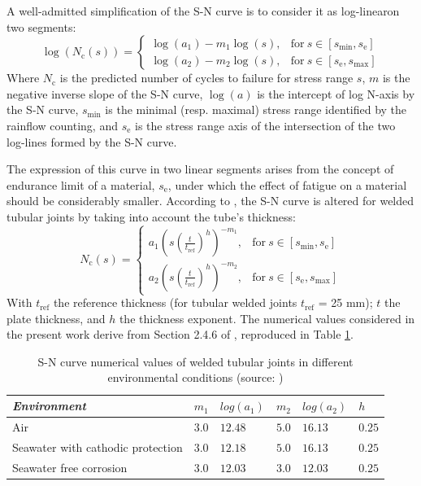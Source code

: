 A well-admitted simplification of the S-N curve is to consider it as log-linear\footnotemark on two segments:
\begin{equation}
\log(N_{\mathrm{c}}(s)) = \left\{
    \begin{array}{ll}
        \log(a_1) - m_1 \log(s), & \mbox{for}~ s \in [s_{\mathrm{min}}, s_{\mathrm{e}}] \\
        \log(a_2) - m_2 \log(s), & \mbox{for}~ s \in [s_{\mathrm{e}}, s_{\mathrm{max}}]
    \end{array}
\right.
\end{equation}
Where $N_{\mathrm{c}}$ is the predicted number of cycles to failure for stress range $s$, $m$ is the negative inverse slope of the S-N curve, 
$\log(a)$ is the intercept of log N-axis by the S-N curve, $s_{\mathrm{min}}$ is the minimal (resp. maximal) stress range identified by the rainflow counting, 
and $s_{\mathrm{e}}$ is the stress range axis of the intersection of the two log-lines formed by the S-N curve. 


The expression of this curve in two linear segments arises from the concept of endurance limit of a material, $s_{\mathrm{e}}$, under which the effect of fatigue on a material should be considerably smaller. 
According to \cite{dnv_fatigue_2016}, the S-N curve is altered for welded tubular joints by taking into account the tube's thickness:
\begin{equation}
N_{\mathrm{c}}(s) = \left\{
    \begin{array}{ll}
        a_{1} \left(s (\frac{t}{t_{\mathrm{ref}}})^h\right) ^{-m_1}, & \mbox{for}~ s \in [s_{\mathrm{min}}, s_{\mathrm{e}}]\\
        a_{2} \left(s (\frac{t}{t_{\mathrm{ref}}})^h\right)^{-m_2}, & \mbox{for}~ s \in [s_{\mathrm{e}}, s_{\mathrm{max}}]
    \end{array}
\right.
\end{equation}
With $t_{\mathrm{ref}}$ the reference thickness (for tubular welded joints $t_{\mathrm{ref}}$ = 25 mm); $t$ the plate thickness, and $h$ the thickness exponent. 
The numerical values considered in the present work derive from Section 2.4.6 of \citet{dnv_fatigue_2016}, reproduced in Table \ref*{tab:sn_table}. 

\begin{table}[h]
    \centering
    \caption{S-N curve numerical values of welded tubular joints in different environmental conditions (source: \citealp{dnv_fatigue_2016})}
    \begin{tabular}{l|l|l|l|l|l}
     \hline
     \textit{Environment} & $m_1$ & $log(a_1)$ & $m_2$ & $log(a_2)$ & $h$\\
     \hline
     Air & $3.0$ & $12.48$ & $5.0$ & $16.13$ & $0.25$\\
     Seawater with cathodic protection & $3.0$ & $12.18$ & $5.0$ & $16.13$ & $0.25$\\ Seawater free corrosion & $3.0$ & $12.03$ & $3.0$ & $12.03$ & $0.25$\\ 
    \end{tabular}
    \label{tab:sn_table}
\end{table}


